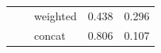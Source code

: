 \documentclass{article}
\begin{document}
\begin{table}[]
\begin{tabular}{|l|llll|}
                           & \multicolumn{1}{l|}{}                                                                                     & \multicolumn{1}{l|}{weighted}               & 0.438          & 0.296  \\ \cline{3-5} 
                           & \multicolumn{1}{l|}{}                                                                                     & \multicolumn{1}{l|}{concat}                 & 0.806          & 0.107  \\ \hline
\end{tabular}
\end{table}

\pagebreak

{}

\end{document}
